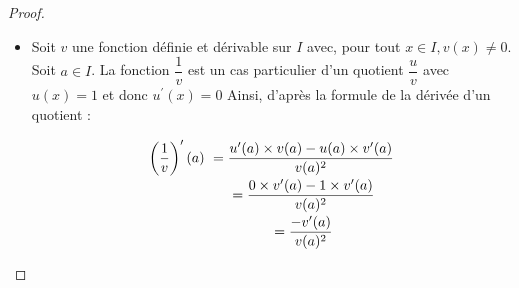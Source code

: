 \documentclass[12pt]{article}
\theoremstyle{break}
\begin{document}
\begin{proof}
\begin{itemize}
  \item Soit $v$ une fonction définie et dérivable sur $I$ avec, pour tout $x \in I, v(x) \neq 0$. Soit $a \in I$. La fonction $\dfrac{1}{v}$ est un cas particulier d'un quotient $\dfrac{u}{v}$ avec $u(x)=1$ et donc $u^{\prime}(x)=0$ Ainsi, d'après la formule de la dérivée d'un quotient :


\begin{equation*}\arraycolsep=3pt\def\arraystretch{2}
  \begin{array}{rcl}
    \left(\dfrac{1}{v}\right)^{\prime}(a) & =\dfrac{u^{\prime}(a) \times v(a)-u(a) \times v^{\prime}(a)}{v(a)^{2}} \\
    & =\dfrac{0 \times v^{\prime}(a)-1 \times v^{\prime}(a)}{v(a)^{2}} \\
    & =\dfrac{-v^{\prime}(a)}{v(a)^{2}}
  \end{array}
\end{equation*}
\end{itemize}
\end{proof}
\end{document}
